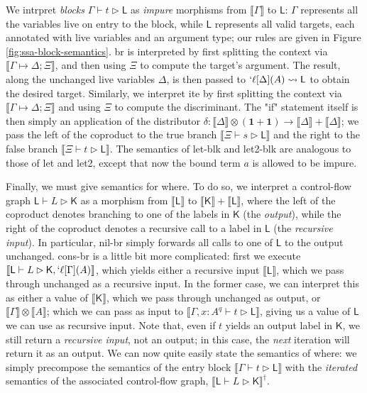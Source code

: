 \documentclass[acmsmall,screen,review]{acmart}
\newcommand{\mb}[1]{\ensuremath{\mathbf{#1}}}
\newcommand{\ms}[1]{\ensuremath{\mathsf{#1}}}
\newcommand{\lbl}[1]{{`#1}}
\newcommand{\csplits}[3]{#1 \mapsto #2;#3}
\newcommand{\lwk}[2]{#1 \rightsquigarrow #2}
\newcommand{\thyp}[3]{#1: {#2}^{#3}}
\newcommand{\lhyp}[3]{#1[#2](#3)}
\newcommand{\llhyp}[3]{\lhyp{\lbl{#1}}{#2}{#3}}
\newcommand{\rle}[1]{{\scriptsize\textsf{#1}}}
\newcommand{\haslb}[3]{#1 \vdash #2 \rhd #3}
\newcommand{\lhaslb}[3]{#1 \vdash #2 \rhd #3}
\newcommand{\dnt}[1]{\llbracket{#1}\rrbracket}
\begin{document}
We intrpret \textit{blocks} \(\haslb{\Gamma}{t}{\ms{L}}\) as \textit{impure}
morphisms from \(\dnt{\Gamma}\) to \(\ms{L}\): \(\Gamma\) represents all the
variables live on entry to the block, while \(\ms{L}\) represents all valid
targets, each annotated with live variables and an argument type; our rules are
given in Figure \ref{fig:ssa-block-semantics}. \rle{br} is interpreted by first
splitting the context via \(\dnt{\csplits{\Gamma}{\Delta}{\Xi}}\), and then
using \(\Xi\) to compute the target's argument. The result, along the unchanged
live variables \(\Delta\), is then passed to
\(\lwk{\llhyp{\ell}{\Delta}{A}}{\ms{L}}\) to obtain the desired target.
Similarly, we interpret \rle{ite} by first splitting the context via
\(\dnt{\csplits{\Gamma}{\Delta}{\Xi}}\) and using \(\Xi\) to compute the
discriminant. The "if" statement itself is then simply an application of the
distributor \(\delta: \dnt{\Delta} \otimes (\mb{1} + \mb{1}) \to \dnt{\Delta} +
\dnt{\Delta}\); we pass the left of the coproduct to the true branch
\(\dnt{\haslb{\Xi}{s}{\ms{L}}}\) and the right to the false branch
\(\dnt{\haslb{\Xi}{t}{\ms{L}}}\). The semantics of \rle{let-blk} and
\rle{let2-blk} are analogous to those of \rle{let} and \rle{let2}, except that
now the bound term \(a\) is allowed to be impure.

Finally, we must give semantics for \rle{where}. To do so, we interpret a
control-flow graph \(\lhaslb{\ms{L}}{L}{\ms{K}}\) as a morphism from
\(\dnt{\ms{L}}\) to \(\dnt{\ms{K}} + \dnt{\ms{L}}\), where the left of the
coproduct denotes branching to one of the labels in \(\ms{K}\) (the
\textit{output}), while the right of the coproduct denotes a recursive call to a
label in \(\ms{L}\) (the \textit{recursive input}). In particular, \rle{nil-br}
simply forwards all calls to one of \(\ms{L}\) to the output unchanged.
\rle{cons-br} is a little bit more complicated: first we execute
\(\dnt{\lhaslb{\ms{L}}{L}{\ms{K}, \llhyp{\ell}{\Gamma}{A}}}\), which yields
either a recursive input \(\dnt{\ms{L}}\), which we pass through unchanged as a
recursive input. In the former case, we can interpret this as either a value of
\(\dnt{\ms{K}}\), which we pass through unchanged as output, or \(\dnt{\Gamma}
\otimes \dnt{A}\); which we can pass as input to \(\dnt{\haslb{\Gamma,
\thyp{x}{A}{q}}{t}{\ms{L}}}\), giving us a value of \(\ms{L}\) we can use as
recursive input. Note that, even if \(t\) yields an output label in \(\ms{K}\),
we still return a \textit{recursive input}, not an output; in this case, the
\textit{next} iteration will return it as an output. We can now quite easily
state the semantics of \rle{where}: we simply precompose the semantics of the
entry block \(\dnt{\haslb{\Gamma}{t}{\ms{L}}}\) with the \textit{iterated}
semantics of the associated control-flow graph,
\(\dnt{\lhaslb{\ms{L}}{L}{\ms{K}}}^\dagger\).
\end{document}
